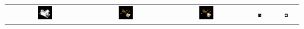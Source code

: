 \begin{table}[!htb]
\begin{tabular*}{\textwidth}{ c c c c c }
          \includegraphics[width=0.19\textwidth]{figures/results/arb_set/validation/lego10_exva_hdrflip_150k.png}
        & \includegraphics[width=0.19\textwidth]{figures/results/arb_set/validation/lego10_exva_150k.png}
        & \includegraphics[width=0.19\textwidth]{figures/results/arb_set/validation/lego10_targ_256px.png}
        & \includegraphics[width=0.19\textwidth]{figures/results/arb_set/validation/lego10_exbf_112k.png}
        & \includegraphics[width=0.19\textwidth]{figures/results/arb_set/validation/lego10_exbf_hdrflip_112k.png} \\[-6pt]
        

\end{tabular*}
\end{table}
